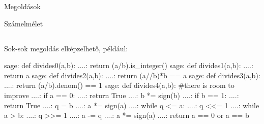 \documentclass{amsbook}
\theoremstyle{mystyle}
\begin{document}
\begin{part}{Megoldások}

  \begin{section}{Számelmélet}

    \subsection{} Sok-sok megoldás elképzelhet\H o, például:
      \begin{sageexample}
          sage: def divides0(a,b):
          ....:     return (a/b).is_integer()
          sage: def divides1(a,b):
          ....:     return a %
          sage: def divides2(a,b):
          ....:     return (a//b)*b == a
          sage: def divides3(a,b):
          ....:     return (a/b).denom() == 1
          sage: def divides4(a,b): #there is room to improve
          ....:     if a == 0:
          ....:         return True
          ....:     b *= sign(b)
          ....:     if b == 1:
          ....:         return True
          ....:     q = b
          ....:     a *= sign(a)
          ....:     while q <= a:
          ....:         q <<= 1
          ....:     while a > b:
          ....:         q >>= 1
          ....:         a -= q  
          ....:         a *= sign(a)
          ....:     return a == 0 or a == b

          \end{sageexample}

      \end{section}

    \end{part}

    
\end{document}
